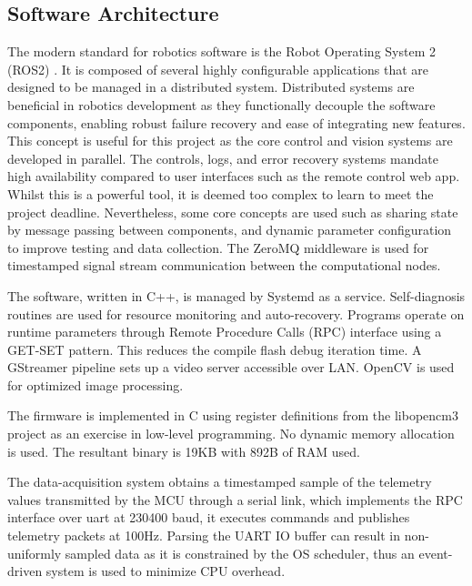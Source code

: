         \subsection{Software Architecture}
        The modern standard for robotics software is the Robot Operating System 2 (ROS2) \cite{Macenski2022RobotOS}. 
        It is composed of several highly configurable applications that are designed to be managed in a distributed system.
        Distributed systems are beneficial in robotics development as they functionally decouple the software components, 
        enabling robust failure recovery and ease of integrating new features. This concept is useful for this project as 
        the core control and vision systems are developed in parallel. The controls, logs, and error recovery systems mandate 
        high availability compared to user interfaces such as the remote control web app. 
        Whilst this is a powerful tool, it is deemed too complex to learn to meet the project deadline.
        Nevertheless, some core concepts are used such as sharing state by message passing between components, 
        and dynamic parameter configuration to improve testing and data collection. The ZeroMQ middleware is used for 
        timestamped signal stream communication between the computational nodes. 
       
        The software, written in C++, is managed by Systemd as a service. 
        Self-diagnosis routines are used for resource monitoring and auto-recovery. 
        Programs operate on runtime parameters through Remote Procedure Calls (RPC) 
        interface using a GET-SET pattern. This reduces the 
        compile flash debug iteration time. A GStreamer pipeline sets up a video 
        server accessible over LAN. OpenCV is used for optimized image processing.
             
        The firmware is implemented in C using register definitions from the 
        libopencm3 project \cite{BeginningSTM32} as an exercise in low-level programming. 
        No dynamic memory allocation is used.
        The resultant binary is 19KB with 892B of RAM used.
              
        The data-acquisition system obtains a timestamped sample of the 
        telemetry values transmitted by the MCU through a serial link, which implements the
        RPC interface over uart at 230400 baud, 
        it executes commands and publishes telemetry packets at 100Hz.
        Parsing the UART IO buffer can result in non-uniformly sampled data as it
        is constrained by the OS scheduler, thus an event-driven system is used to 
        minimize CPU overhead.
